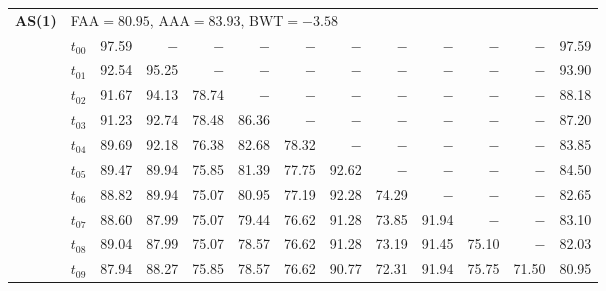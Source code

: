 \begin{table}[ht]
\begin{tabular}{@{}l l r r r r r r r r r r r@{}}
\midrule
\multirow{11}{*}{\textbf{AS(1)}} & \multicolumn{12}{l}{\quad\small FAA$=80.95$,\; AAA$=83.93$,\; BWT$=-3.58$} \\
 & $t_{00}$ & 97.59 & $-$ & $-$ & $-$ & $-$ & $-$ & $-$ & $-$ & $-$ & $-$ & 97.59 \\
 & $t_{01}$ & 92.54 & 95.25 & $-$ & $-$ & $-$ & $-$ & $-$ & $-$ & $-$ & $-$ & 93.90 \\
 & $t_{02}$ & 91.67 & 94.13 & 78.74 & $-$ & $-$ & $-$ & $-$ & $-$ & $-$ & $-$ & 88.18 \\
 & $t_{03}$ & 91.23 & 92.74 & 78.48 & 86.36 & $-$ & $-$ & $-$ & $-$ & $-$ & $-$ & 87.20 \\
 & $t_{04}$ & 89.69 & 92.18 & 76.38 & 82.68 & 78.32 & $-$ & $-$ & $-$ & $-$ & $-$ & 83.85 \\
 & $t_{05}$ & 89.47 & 89.94 & 75.85 & 81.39 & 77.75 & 92.62 & $-$ & $-$ & $-$ & $-$ & 84.50 \\
 & $t_{06}$ & 88.82 & 89.94 & 75.07 & 80.95 & 77.19 & 92.28 & 74.29 & $-$ & $-$ & $-$ & 82.65 \\
 & $t_{07}$ & 88.60 & 87.99 & 75.07 & 79.44 & 76.62 & 91.28 & 73.85 & 91.94 & $-$ & $-$ & 83.10 \\
 & $t_{08}$ & 89.04 & 87.99 & 75.07 & 78.57 & 76.62 & 91.28 & 73.19 & 91.45 & 75.10 & $-$ & 82.03 \\
 & $t_{09}$ & 87.94 & 88.27 & 75.85 & 78.57 & 76.62 & 90.77 & 72.31 & 91.94 & 75.75 & 71.50 & 80.95 \\
\bottomrule
\end{tabular}
\end{table}

